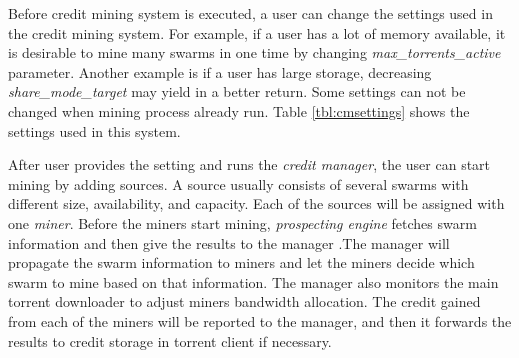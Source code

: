 Before credit mining system is executed, a user can change the settings used in the credit mining system. For example, if a user has a lot of memory available, it is desirable to mine many swarms in one time by changing \textit{max\_torrents\_active} parameter. Another example is if a user has large storage, decreasing \textit{share\_mode\_target} may yield in a better return. Some settings can not be changed when mining process already run. Table \ref{tbl:cmsettings} shows the settings used in this system. 

After user provides the setting and runs the \textit{credit manager}, the user can start mining by adding sources. A source usually consists of several swarms with different size, availability, and capacity. Each of the sources will be assigned with one \textit{miner}. Before the miners start mining, \textit{prospecting engine} fetches swarm information and then give the results to the manager .The manager will propagate the swarm information to miners and let the miners decide which swarm to mine based on that information. The manager also monitors the main torrent downloader to adjust miners bandwidth allocation. The credit gained from each of the miners will be reported to the manager, and then it forwards the results to credit storage in torrent client if necessary.

